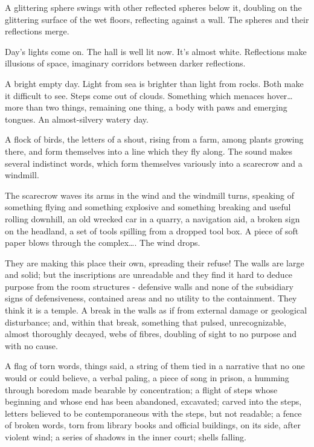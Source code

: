\documentclass[
]{memoir}
\newlength{\drop}%
\begin{document}
A glittering sphere swings with other reflected spheres below it,
doubling on the glittering surface of the wet floors, reflecting against
a wall. The spheres and their reflections merge.

Day's lights come on. The hall is well lit now. It's almost white.
Reflections make illusions of space, imaginary corridors between darker
reflections.

A bright empty day. Light from sea is brighter than light from rocks.
Both make it difficult to see. Steps come out of clouds. Something which
menaces hover\ldots{} more than two things, remaining one thing, a body
with paws and emerging tongues. An almost-silvery watery day.

A flock of birds, the letters of a shout, rising from a farm, among
plants growing there, and form themselves into a line which they fly
along. The sound makes several indistinct words, which form themselves
variously into a scarecrow and a windmill.

The scarecrow waves its arms in the wind and the windmill turns,
speaking of something flying and something explosive and something
breaking and useful rolling downhill, an old wrecked car in a quarry, a
navigation aid, a broken sign on the headland, a set of tools spilling
from a dropped tool box. A piece of soft paper blows through the
complex\ldots{}. The wind drops.

They are making this place their own, spreading their refuse! The walls
are large and solid; but the inscriptions are unreadable and they find
it hard to deduce purpose from the room structures - defensive walls and
none of the subsidiary signs of defensiveness, contained areas and no
utility to the containment. They think it is a temple. A break in the
walls as if from external damage or geological disturbance; and, within
that break, something that pulsed, unrecognizable, almost thoroughly
decayed, webs of fibres, doubling of sight to no purpose and with no
cause.

A flag of torn words, things said, a string of them tied in a narrative
that no one would or could believe, a verbal paling, a piece of song in
prison, a humming through boredom made bearable by concentration; a
flight of steps whose beginning and whose end has been abandoned,
excavated; carved into the steps, letters believed to be contemporaneous
with the steps, but not readable; a fence of broken words, torn from
library books and official buildings, on its side, after violent wind; a
series of shadows in the inner court; shells falling.
\end{document}
